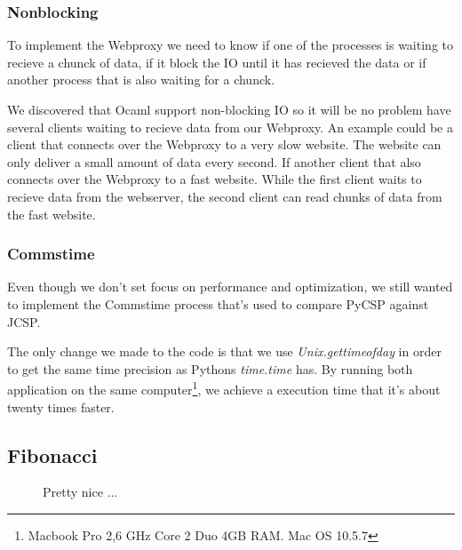 \documentclass[a4paper,12pt]{article}
\begin{document}
\subsubsection*{Nonblocking}
To implement the Webproxy we need to know if one of the processes is waiting
to recieve a chunck of data, if it block the IO until it has recieved the data
or if another process that is also waiting for a chunck.

We discovered that Ocaml support non-blocking IO so it will be no problem have
several clients waiting to recieve data from our Webproxy. An example could
be a client that connects over the Webproxy to a very slow website. The website
can only deliver a small amount of data every second. If another client that
also connects over the Webproxy to a fast website. While the first client
waits to recieve data from the webserver, the second client can read chunks
of data from the fast website.


\subsubsection*{Commstime}
Even though we don't set focus on performance and optimization, we still wanted
to implement the Commstime\cite{vinterpycsp} process that's used to compare
PyCSP against JCSP.

The only change we made to the code is that we use {\it Unix.gettimeofday} in
order to get the same time precision as Pythons {\it time.time} has. By running
both application on the same computer\footnote{Macbook Pro 2,6 GHz Core 2 Duo
4GB RAM. Mac OS 10.5.7}, we achieve a execution time that it's about twenty
times faster.

\newpage
\subsection{Fibonacci}
\begin{figure}[htp]
  \begin{center}
  \end{center}
  \caption{Pretty nice ...}
\end{figure}
\end{document}
